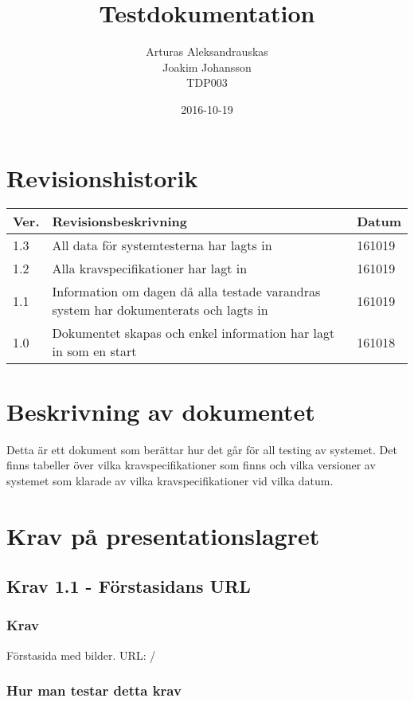 \documentclass{TDP003mall}
\author{Arturas Aleksandrauskas\\
  Joakim Johansson\\
TDP003}
\title{Testdokumentation}
\date{2016-10-19}
\begin{document}
\projectpage

\tableofcontents

\newpage
\section{Revisionshistorik}
\begin{table}[!h]
\begin{tabularx}{\linewidth}{|l|X|l|}
\hline
Ver. & Revisionsbeskrivning & Datum \\\hline
1.3 & All data för systemtesterna har lagts in & 161019 \\\hline
1.2 & Alla kravspecifikationer har lagt in & 161019 \\\hline
1.1 & Information om dagen då alla testade varandras system har dokumenterats och lagts in & 161019 \\\hline
1.0 & Dokumentet skapas och enkel information har lagt in som en start & 161018 \\\hline
\end{tabularx}
\end{table}

\section{Beskrivning av dokumentet}
Detta är ett dokument som berättar hur det går för all testing av systemet. Det finns tabeller över vilka kravspecifikationer som finns och vilka versioner av systemet som klarade av vilka kravspecifikationer vid vilka datum.

\newpage
\section{Krav på presentationslagret}

    \subsection{Krav 1.1 - Förstasidans URL}
    
        \subsubsection{Krav}
        Förstasida med bilder. URL: /
    
        \subsubsection{Hur man testar detta krav}
        
\end{document}
